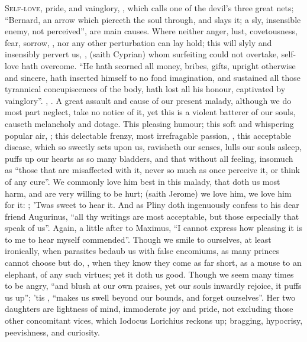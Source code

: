\lettrine{S}{elf-love}, pride, and vainglory, , which \Chrysostom{} calls one of the devil's three great nets;
\enquote{Bernard, an arrow which pierceth the soul through, and
slays it; a sly, insensible enemy, not perceived}, are main causes. Where
neither anger, lust, covetousness, fear, sorrow, \etc{}, nor any other
perturbation can lay hold; this will slyly and insensibly pervert us, , (saith Cyprian) whom surfeiting could
not overtake, self-love hath overcome. \enquote{He hath scorned
all money, bribes, gifts, upright otherwise and sincere, hath inserted himself
to no fond imagination, and sustained all those tyrannical concupiscences of
the body, hath lost all his honour, captivated by vainglory}. \Chrysostom{},
 .
A great assault and cause of our present malady, although we do most part
neglect, take no notice of it, yet this is a violent batterer of our souls,
causeth melancholy and dotage. This pleasing humour; this soft and whispering
popular air, ; this delectable frenzy, most irrefragable
passion, , this acceptable disease, which so
sweetly sets upon us, ravisheth our senses, lulls our souls asleep, puffs up
our hearts as so many bladders, and that without all feeling,
insomuch as \enquote{those that are misaffected with it, never so
much as once perceive it, or think of any cure}. We commonly love him best in
this malady, that doth us most harm, and are very willing
to be hurt;  (saith
Jerome) we love him, we love him for it:
;
'Twas sweet to hear it. And as Pliny doth ingenuously
confess to his dear friend Augurinus, \enquote{all thy writings are most acceptable,
but those especially that speak of us}. Again, a little after to Maximus,
\enquote{I cannot express how pleasing it is to me to hear myself
commended}. Though we smile to ourselves, at least ironically, when parasites
bedaub us with false encomiums, as many princes cannot choose but do, , when they know they come as far short, as
a mouse to an elephant, of any such virtues; yet it doth us good. Though we
seem many times to be angry, \enquote{and blush at our own
praises, yet our souls inwardly rejoice, it puffs us up}; 'tis , \enquote{makes us swell beyond our bounds, and forget
ourselves}. Her two daughters are lightness of mind, immoderate joy and pride,
not excluding those other concomitant vices, which Iodocus
Lorichius reckons up; bragging, hypocrisy, peevishness, and curiosity.


